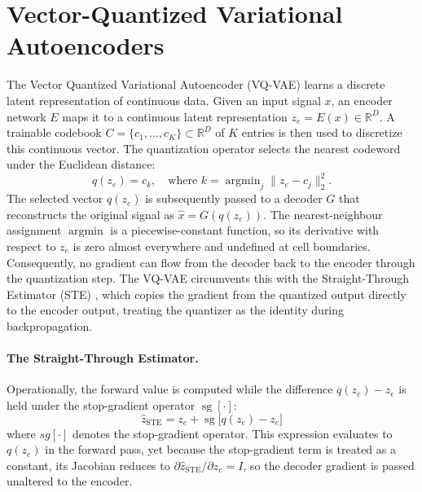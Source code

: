 \documentclass[12pt]{report}
\begin{document}
\section{Vector-Quantized Variational Autoencoders}
\label{sec:bg_vq}
The Vector Quantized Variational Autoencoder (VQ-VAE) \cite{vqvae} learns a discrete latent representation of continuous data. Given an input signal $x$, an encoder network $E$ maps it to a continuous latent representation $z_e = E(x) \in \mathbb{R}^D$. A trainable codebook $C = \{c_1, \dots, c_K\} \subset \mathbb{R}^D$ of $K$ entries is then used to discretize this continuous vector. The quantization operator selects the nearest codeword under the Euclidean distance:
\begin{equation}
    q(z_e) = c_k, \quad \text{where } k = \operatorname{argmin}_j \| z_e - c_j \|^2_2.
\end{equation}
The selected vector $q(z_e)$ is subsequently passed to a decoder $G$ that reconstructs the original signal as $\hat{x} = G(q(z_e))$. The nearest-neighbour assignment $\operatorname{argmin}$ is a piecewise-constant function, so its derivative with respect to $z_e$ is zero almost everywhere and undefined at cell boundaries. Consequently, no gradient can flow from the decoder back to the encoder through the quantization step. The VQ-VAE circumvents this with the Straight-Through Estimator (STE) \cite{straight_through_estimator}, which copies the gradient from the quantized output directly to the encoder output, treating the quantizer as the identity during backpropagation.

\paragraph{The Straight-Through Estimator.}
 Operationally, the forward value is computed while the difference $q(z_e) - z_e$ is held under the stop-gradient operator $\operatorname{sg}[\cdot]$:
\begin{equation}
    \label{eq:bg_ste}
    \hat{z}_{\text{STE}} = z_e + \operatorname{sg}\big[q(z_e) - z_e\big]
\end{equation}
where $sg[\cdot]$ denotes the stop-gradient operator. This expression evaluates to $q(z_e)$ in the forward pass, yet because the stop-gradient term is treated as a constant, its Jacobian reduces to $\partial \hat{z}_{\text{STE}} / \partial z_e = I$, so the decoder gradient is passed unaltered to the encoder.
\end{document}
